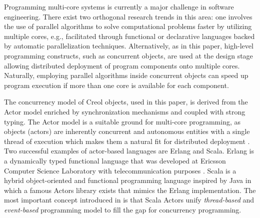 
Programming multi-core systems is currently a major challenge in software
engineering. There exist two orthogonal research trends in this area: one
involves the use of parallel algorithms to solve computational problems faster
by utilizing multiple cores, e.g., facilitated through functional or declarative
languages backed by automatic parallelization techniques. Alternatively, as in
this paper, high-level programming constructs, such as concurrent objects, are
used at the design stage allowing distributed deployment of  program components
onto multiple cores. Naturally, employing parallel algorithms inside concurrent
objects can speed up program execution if more than one core is available for
each component.
%
%

The concurrency model of Creol objects, used in this paper, is derived from the
Actor model enriched by synchronization mechanisms and coupled with strong
typing. The Actor model \cite{actors:agha} is a suitable ground for multi-core
programming, as objects (actors) are inherently concurrent and autonomous
entities with a single thread of execution which makes them a natural fit for
distributed deployment \cite{actor_frameworks_jvm:agha}. Two successful examples
of actor-based languages are Erlang and Scala.
%
Erlang \cite{erlang:armstrong} is a dynamically typed functional language that
was developed at Ericsson Computer Science Laboratory with telecommunication
purposes \cite{actors_highly:Correa}.
%
Scala is a hybrid
object-oriented and functional programming language inspired by Java in which a
famous Actors library exists that mimics the Erlang implementation. The most
important concept introduced in \cite{scala_actors:ordersky,coord:ordersky} is
that Scala Actors unify \textit{thread-based} and \textit{event-based}
programming model to fill the gap for concurrency programming.

